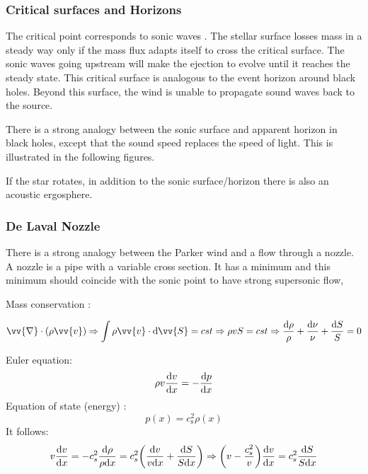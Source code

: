 \documentclass[10pt,a4paper,english]{article}
\let\originalleft\left
\let\originalright\right
\renewcommand{\left}{\mathopen{}\mathclose\bgroup\originalleft}
\renewcommand{\right}{\aftergroup\egroup\originalright}
\begin{document}
\subsubsection{Critical surfaces and Horizons}

The critical point corresponds to sonic waves . The stellar surface losses mass in a steady
way only if the mass flux  adapts itself to cross the critical surface. The sonic waves going
upstream will make the ejection to evolve until it reaches the steady state. This critical surface
is analogous to the event horizon around black holes. Beyond this surface, the wind is unable
to propagate sound waves back to the source.

There is a strong analogy between the sonic surface and apparent horizon in black holes,
except that the sound speed  replaces the speed of light. This is illustrated in the following
figures.


If the star rotates, in addition to the sonic surface/horizon there is also an acoustic ergosphere.


\subsubsection{De Laval Nozzle}

There is a strong analogy between the Parker wind and a flow through a nozzle. A nozzle is a
pipe with a variable cross section. It has a minimum and this minimum should coincide with the
sonic point to have strong supersonic flow,


Mass conservation :

\begin{equation}
    \vv{\nabla}\cdot(\rho\vv{v}) \Rightarrow \int \rho\vv{v}\cdot \d \vv{S} = cst \Rightarrow \rho vS = cst
    \Rightarrow \frac{\d \rho}{\rho} + \frac{\d \nu}{\nu} + \frac{\d S}{S} = 0
\end{equation}

Euler equation:
\begin{equation}
    \rho v \frac{\mathrm{d} v}{\mathrm{d} x} = -\frac{\mathrm{d} p}{\mathrm{d} x}
\end{equation}
Equation of state (energy) :
\begin{equation}
    p(x) = c_\mathrm{s}^2\rho(x)
\end{equation}
It follows:
\begin{equation}
    v\frac{\d v}{\d x} = -c_s^2\frac{\d\rho}{\rho \d x} = c_s^2\left(\frac{\d v}{v\d x}+\frac{\d S}{S\d x}\right)
    \Rightarrow \left( v - \frac{c_s^2}{v} \right)\frac{\d v}{\d x} = c_s^2\frac{\d S}{S \d x}
\end{equation}
\end{document}
